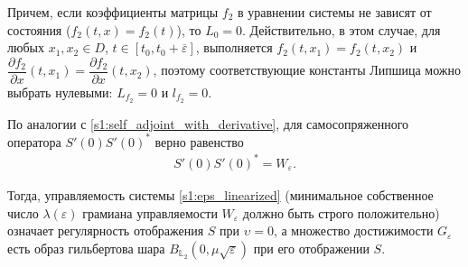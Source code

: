 \documentclass[../main.tex]{subfiles}
\begin{document}
 Причем, если коэффициенты матрицы $f_2$ в уравнении системы не зависят от состояния ($f_2(t,x) = f_2(t)$), то $L_0 = 0$. 
Действительно, в этом случае, для любых $x_1, x_2 \in D$, $t\in [t_0, t_0 + \overline{\varepsilon}]$, выполняется $f_2(t,x_1) = f_2(t, x_2)$ и $\dfrac{\partial f_2}{\partial x} (t, x_1) = \dfrac{\partial f_2}{\partial x} (t, x_2)$, поэтому соответствующие константы Липшица можно выбрать нулевыми:   $ L_{f_2} = 0$ и $l_{f_2} = 0$.
  
По аналогии с \eqref{s1:self_adjoint_with_derivative}, для самосопряженного оператора $S'(0)S'(0)^*$ верно равенство 
\begin{gather*}
	S'(0)S'(0)^* = W_{\varepsilon}. 
\end{gather*}
  
Тогда, управляемость системы \eqref{s1:eps_linearized} (минимальное собственное число $ \lambda(\varepsilon) $ грамиана управляемости $W_{\varepsilon}$ должно быть строго положительно) означает регулярность отображения $S$ при $\upsilon = 0$, а множество достижимости $G_{\varepsilon}$ есть образ гильбертова шара $B_{\mathbb{L}_2}(0,\mu\sqrt{\varepsilon})$ при его отображении $S$.
 
\end{document}
